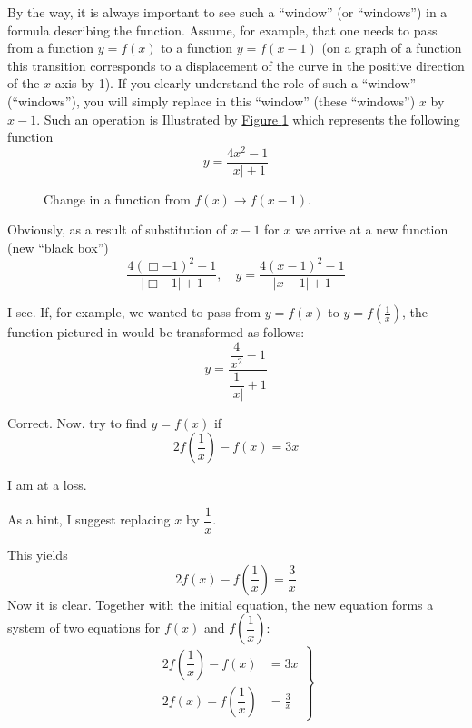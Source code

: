 {By the way, it is always important to see such a ``window'' (or ``windows'') in a formula describing the function. Assume, for example, that one needs to pass from a function $y = f (x)$ to a function $y = f(x - 1)$ (on a graph of a function this transition corresponds to a displacement of the curve in the positive direction of the $x$-axis by 1). If you clearly understand the role of such a ``window'' (``windows''), you will simply replace in this ``window'' (these ``windows'') $x$ by $x - 1$. Such an operation is Illustrated by \hyperref[fig-11]{Figure \ref{fig-11}} which represents the following function
\begin{equation*}%
y = \frac{4 x^{2} - 1}{|x| + 1}
\end{equation*}
\begin{figure}[!h]
\centering

\caption{Change in a function from $f(x) \to f(x-1)$.}
\label{fig-11}
\end{figure}
Obviously, as a result of substitution of $x - 1$ for $x$ we arrive at a new function (new ``black box'') 
\begin{equation*}%
\frac{4 (\Box - 1)^{2} - 1}{|\Box -1 | + 1}, \quad y = \frac{4 (x - 1)^{2} - 1}{|x -1 | + 1}
\end{equation*}

\rdr I see. If, for example, we wanted to pass from $y = f (x)$ to $y = f \left( \frac{1}{x} \right)$, the function pictured in  would be transformed as follows:
\begin{equation*}%
y = \frac{\dfrac{4}{x^{2}} -1 }{\dfrac{1}{|x |} + 1}
\end{equation*}

\athr Correct. Now. try to find $y = f (x)$ if
\begin{equation*}%
2 f	\left( \dfrac{1}{x } \right) - f(x) = 3x
\end{equation*}

\rdr I am at a loss. 

\athr As a hint, I suggest replacing $x$ by $\dfrac{1}{x } $.

\rdr This yields
\begin{equation*}%
2 f (x)	- f \left( \dfrac{1}{x } \right) = \frac{3}{x}
\end{equation*}
Now it is clear. Together with the initial equation, the new equation forms a system of two equations for $f (x)$ and $f \left( \dfrac{1}{x } \right) $:
\begin{equation*}
\left.
\begin{split}
2f \left( \dfrac{1}{x } \right) - f(x) & = 3x \\
2 f(x) - f \left( \dfrac{1}{x } \right)  & = \frac{3}{x}
\end{split}
\right\}
\end{equation*}

}
